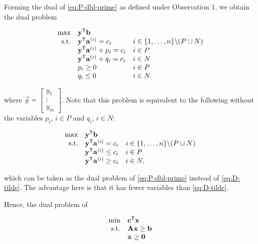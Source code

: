 Forming the dual of \eqref{eq:P-dbl-prime} as defined under Observation 1,
we obtain the dual problem

\begin{equation}
\begin{array}{rll}
\max & \mathbf{y}^{\mathsf{T}}\mathbf{b} \\
\mbox{s.t.} & 
 \mathbf{y}^{\mathsf{T}}\mathbf{a}^{(i)} = c_i & i \in \{1,\ldots,n\}\backslash 
(P\cup N) \\
&\mathbf{y}^{\mathsf{T}}\mathbf{a}^{(i)} + p_i = c_i & i \in P \\
& \mathbf{y}^{\mathsf{T}}\mathbf{a}^{(i)} + q_i = c_i & i \in N \\
& p_i \geq 0 & i \in P \\
& q_i \leq 0 & i \in N \\
\end{array} \label{eq:D-tilde}
\end{equation}

where \(\vec{y} = \begin{bmatrix} y_1\\ \vdots \\ y_m\end{bmatrix}\).
Note that this problem is equivalent to the following without the
variables \(p_i\), \(i \in P\) and \(q_i\), \(i \in N\):

\begin{equation}
\begin{array}{rll}
\max & \mathbf{y}^{\mathsf{T}}\mathbf{b} \\
\mbox{s.t.} & 
 \mathbf{y}^{\mathsf{T}}\mathbf{a}^{(i)} = c_i & i \in \{1,\ldots,n\}\backslash 
(P\cup N) \\
&\mathbf{y}^{\mathsf{T}}\mathbf{a}^{(i)} \leq c_i & i \in P      \\
& \mathbf{y}^{\mathsf{T}}\mathbf{a}^{(i)} \geq c_i & i \in N,     \\
\end{array}
\end{equation}

which can be taken as the dual problem of \eqref{eq:P-dbl-prime} instead
of \eqref{eq:D-tilde}. The advantage here is that it has fewer variables
than \eqref{eq:D-tilde}.

Hence, the dual problem of

\begin{equation*}
\begin{array}{rl}
\min & \mathbf{c}^{\mathsf{T}}\mathbf{x}  \\
\mbox{s.t.} & \mathbf{A}\mathbf{x} \geq \mathbf{b} \\
& \mathbf{x} \geq \mathbf{0}
\end{array}
\end{equation*}

